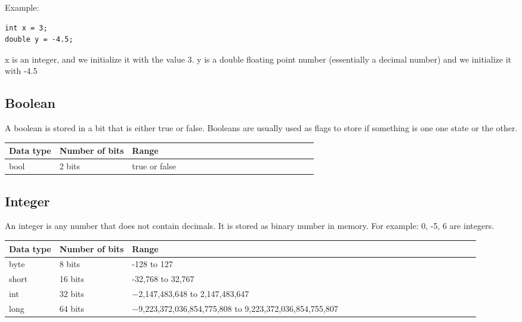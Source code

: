 \documentclass[11pt,oneside]{book}
\begin{document}
Example:

\begin{lstlisting}
int x = 3;
double y = -4.5;
\end{lstlisting}

x is an integer, and we initialize it with the value 3. y is a double floating point number (essentially a decimal number) and we initialize it with -4.5

\subsection{Boolean}

A boolean is stored in a bit that is either true or false. Booleans are usually used as flags to store if something is one one state or the other.

\vspace{10pt} \begin{tabular}{|l|l|l|l|l|l|l|l|l|l|l|l|l|l|l|l|l|l|l}\hline


  Data type &
  Number of bits &
  Range\\
\hline


  bool &
  2 bits &
  true or false\\

\hline\end{tabular}

\subsection{Integer}

An integer is any number that does not contain decimals. It is stored as binary number in memory. For example: 0, -5, 6 are integers.

\vspace{10pt} \begin{tabular}{|l|l|l|l|l|l|l|l|l|l|l|l|l|l|l|l|l|l|l}\hline


  Data type &
  Number of bits &
  Range\\
\hline


  byte &
  8 bits &
  -128 to 127\\

  short &
  16 bits &
  -32,768 to 32,767\\

  int &
  32 bits &
  −2,147,483,648 to 2,147,483,647\\

  long &
  64 bits &
  −9,223,372,036,854,775,808 to 9,223,372,036,854,755,807\\

\hline\end{tabular}
\end{document}
